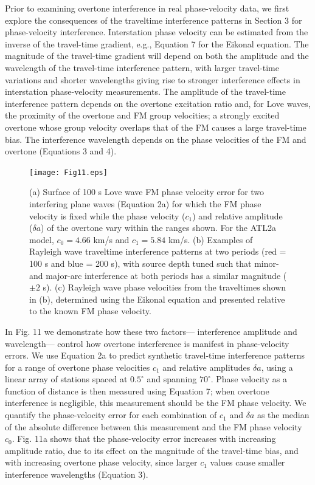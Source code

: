 \documentclass[extra,mreferee]{gji}
\begin{document}
Prior to examining overtone interference in real phase-velocity data, we first explore the consequences of the traveltime interference patterns in Section 3 for phase-velocity interference. Interstation phase velocity can be estimated from the inverse of the travel-time gradient, e.g., Equation 7 for the Eikonal equation. The magnitude of the travel-time gradient will depend on both the amplitude and the wavelength of the travel-time interference pattern, with larger travel-time variations and shorter wavelengths giving rise to stronger interference effects in interstation phase-velocity measurements. The amplitude of the travel-time interference pattern depends on the overtone excitation ratio and, for Love waves, the proximity of the overtone and FM group velocities; a strongly excited overtone whose group velocity overlaps that of the FM causes a large travel-time bias. The interference wavelength depends on the phase velocities of the FM and overtone (Equations 3 and 4).


\begin{figure}
 \texttt{[image: Fig11.eps]}
 \caption{(a) Surface of 100 s Love wave FM phase velocity error for two interfering plane waves (Equation 2a) for which the FM phase velocity is fixed while the phase velocity ($c_1$) and relative amplitude ($\delta a$) of the overtone vary within the ranges shown. For the ATL2a model, $c_0=4.66$ km/s and $c_1=5.84$ km/s. (b) Examples of Rayleigh wave traveltime interference patterns at two periods (red = 100 s and blue = 200 s), with source depth tuned such that minor-and major-arc interference at both periods has a similar magnitude ($\pm 2$ s). (c) Rayleigh wave phase velocities from the traveltimes shown in (b), determined using the Eikonal equation and presented relative to the known FM phase velocity. }
\end{figure} 

In Fig. 11 we demonstrate how these two factors— interference amplitude and wavelength— control how overtone interference is manifest in phase-velocity errors. We use Equation 2a to predict synthetic travel-time interference patterns for a range of overtone phase velocities $c_1$ and relative amplitudes $\delta a$, using a linear array of stations spaced at $0.5 ^\circ$ and spanning $70^\circ$. Phase velocity as a function of distance is then measured using Equation 7; when overtone interference is negligible, this measurement should be the FM phase velocity. We quantify the phase-velocity error for each combination of $c_1$ and $\delta a$ as the median of the absolute difference between this measurement and the FM phase velocity $c_0$. Fig. 11a shows that the phase-velocity error increases with increasing amplitude ratio, due to its effect on the magnitude of the travel-time bias, and with increasing overtone phase velocity, since larger $c_1$ values cause smaller interference wavelengths (Equation 3).
\end{document}
